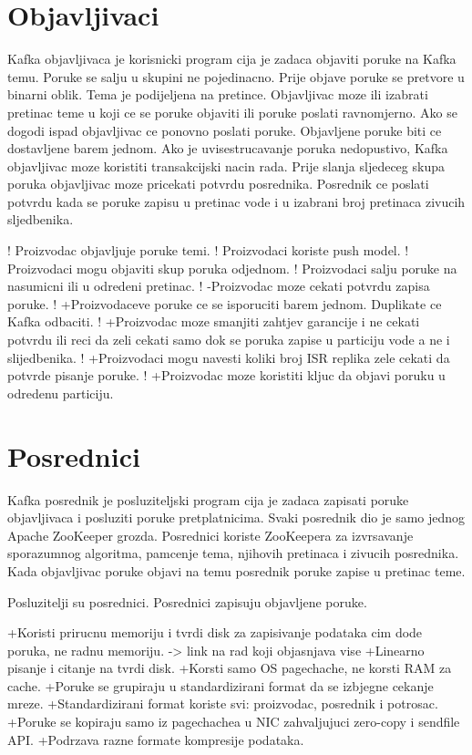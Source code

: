 \documentclass[times, utf8, diplomski, numeric]{fer}
\begin{document}
\chapter{Objavljivaci}
Kafka objavljivaca je korisnicki program cija je zadaca objaviti poruke na Kafka temu. Poruke se salju u skupini ne pojedinacno. Prije objave poruke se pretvore u binarni oblik. Tema je podijeljena na pretince. Objavljivac moze ili izabrati pretinac teme u koji ce se poruke objaviti ili poruke poslati ravnomjerno. Ako se dogodi ispad objavljivac ce ponovno poslati poruke. Objavljene poruke biti ce dostavljene barem jednom. Ako je uvisestrucavanje poruka nedopustivo, Kafka objavljivac moze koristiti transakcijski nacin rada. Prije slanja sljedeceg skupa poruka objavljivac moze pricekati potvrdu posrednika. Posrednik ce poslati potvrdu kada se poruke zapisu u pretinac vode i u izabrani broj pretinaca zivucih sljedbenika.

! Proizvodac objavljuje poruke temi.
! Proizvodaci koriste push model.
! Proizvodaci mogu objaviti skup poruka odjednom.
! Proizvodaci salju poruke na nasumicni ili u odredeni pretinac.
! -Proizvodac moze cekati potvrdu zapisa poruke.
! +Proizvodaceve poruke ce se isporuciti barem jednom. Duplikate ce Kafka odbaciti.
! +Proizvodac moze smanjiti zahtjev garancije i ne cekati potvrdu ili reci da zeli cekati samo dok se poruka zapise u particiju vode a ne i slijedbenika. 
! +Proizvodaci mogu navesti koliki broj ISR replika zele cekati da potvrde pisanje poruke.
! +Proizvodac moze koristiti kljuc da objavi poruku u odredenu particiju.



\chapter{Posrednici}
Kafka posrednik je posluziteljski program cija je zadaca zapisati poruke objavljivaca i posluziti poruke pretplatnicima. Svaki posrednik dio je samo jednog Apache ZooKeeper grozda. Posrednici koriste ZooKeepera za izvrsavanje sporazumnog algoritma, pamcenje tema, njihovih pretinaca i zivucih posrednika. Kada objavljivac poruke objavi na temu posrednik poruke zapise u pretinac teme. 


Posluzitelji su posrednici.
Posrednici zapisuju objavljene poruke.

+Koristi prirucnu memoriju i tvrdi disk za zapisivanje podataka cim dode poruka, ne radnu memoriju. -> link na rad koji objasnjava vise
+Linearno pisanje i citanje na tvrdi disk.
+Korsti samo OS pagechache, ne korsti RAM za cache.
+Poruke se grupiraju u standardizirani format da se izbjegne cekanje mreze.
+Standardizirani format koriste svi: proizvodac, posrednik i potrosac.
+Poruke se kopiraju samo iz pagechachea u NIC zahvaljujuci zero-copy i sendfile API.
+Podrzava razne formate kompresije podataka.
\end{document}
